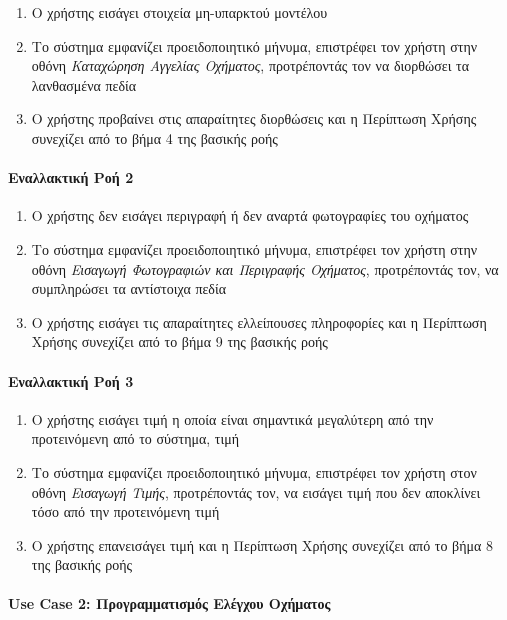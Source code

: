 \documentclass{../ol-softwaremanual}
\begin{document}
	\begin{enumerate}
		\item O χρήστης εισάγει στοιχεία μη-υπαρκτού μοντέλου
		\item Το σύστημα εμφανίζει προειδοποιητικό μήνυμα, επιστρέφει τον χρήστη στην οθόνη \textit{Καταχώρηση Αγγελίας Οχήματος}, προτρέποντάς τον να διορθώσει τα λανθασμένα πεδία
		\item Ο χρήστης προβαίνει στις απαραίτητες διορθώσεις και η Περίπτωση Χρήσης συνεχίζει από το βήμα 4 της βασικής ροής
	\end{enumerate}
	
	\paragraph{Εναλλακτική Ροή 2}
	
	\begin{enumerate}
		\item Ο χρήστης δεν εισάγει περιγραφή ή δεν αναρτά φωτογραφίες του οχήματος
		\item Το σύστημα εμφανίζει προειδοποιητικό μήνυμα, επιστρέφει τον χρήστη στην οθόνη \textit{Εισαγωγή Φωτογραφιών και Περιγραφής Οχήματος}, προτρέποντάς τον, να συμπληρώσει τα αντίστοιχα πεδία
		\item Ο χρήστης εισάγει τις απαραίτητες ελλείπουσες πληροφορίες και η Περίπτωση Χρήσης συνεχίζει από το βήμα 9 της βασικής ροής
	\end{enumerate}
	
	\paragraph{Εναλλακτική Ροή 3}
	
	\begin{enumerate}
		\item Ο χρήστης εισάγει τιμή η οποία είναι σημαντικά μεγαλύτερη από την προτεινόμενη από το σύστημα, τιμή
		\item Το σύστημα εμφανίζει προειδοποιητικό μήνυμα, επιστρέφει τον χρήστη στον οθόνη \textit{Εισαγωγή Τιμής}, προτρέποντάς τον, να εισάγει τιμή που δεν αποκλίνει τόσο από την προτεινόμενη τιμή
		\item Ο χρήστης επανεισάγει τιμή και η Περίπτωση Χρήσης συνεχίζει από το βήμα 8 της βασικής ροής
	\end{enumerate}
	
	
	\paragraph{\en Use Case 2: \gr Προγραμματισμός Ελέγχου Οχήματος}
	
\end{document}
